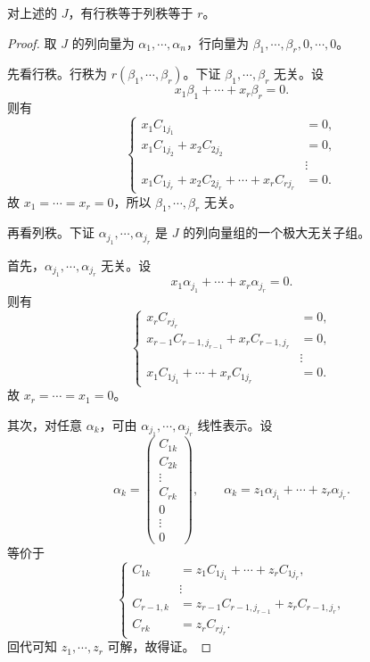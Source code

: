 \begin{theorem}
	对上述的 $J$，有行秩等于列秩等于 $r$。
\end{theorem}
\begin{proof}
	取 $J$ 的列向量为 $\alpha_1,\cdots,\alpha_n$，行向量为
	$\beta_1,\cdots,\beta_r,0,\cdots,0$。
	
	先看行秩。行秩为 $r(\beta_1,\cdots,\beta_r)$。下证
	$\beta_1,\cdots,\beta_r$ 无关。设
	\[
	x_1\beta_1+\cdots+x_r\beta_r=0.
	\]
	则有
	\[
	\left\{
	\begin{aligned}
		x_1C_{1j_1}&=0,\\
		x_1C_{1j_2}+x_2C_{2j_2}&=0,\\
		&\vdots\\
		x_1C_{1j_r}+x_2C_{2j_r}+\cdots+x_rC_{rj_r}&=0.
	\end{aligned}
	\right.
	\]
	故 $x_1=\cdots=x_r=0$，所以 $\beta_1,\cdots,\beta_r$ 无关。
	
	再看列秩。下证 $\alpha_{j_1},\cdots,\alpha_{j_r}$ 是 $J$ 的列向量组的一个极大无关子组。
	
	首先，$\alpha_{j_1},\cdots,\alpha_{j_r}$ 无关。设
	\[
	x_1\alpha_{j_1}+\cdots+x_r\alpha_{j_r}=0.
	\]
	则有
	\[
	\left\{
	\begin{aligned}
		x_rC_{rj_r}&=0,\\
		x_{r-1}C_{r-1,j_{r-1}}+x_rC_{r-1,j_r}&=0,\\
		&\vdots\\
		x_1C_{1j_1}+\cdots+x_rC_{1j_r}&=0.
	\end{aligned}
	\right.
	\]
	故 $x_r=\cdots=x_1=0$。
	
	其次，对任意 $\alpha_k$，可由 $\alpha_{j_1},\cdots,\alpha_{j_r}$ 线性表示。设
	\[
	\alpha_k=
	\begin{pmatrix}
		C_{1k}\\
		C_{2k}\\
		\vdots\\
		C_{rk}\\
		0\\
		\vdots\\
		0
	\end{pmatrix},
	\qquad
	\alpha_k=z_1\alpha_{j_1}+\cdots+z_r\alpha_{j_r}.
	\]
	等价于
	\[
	\left\{
	\begin{aligned}
		C_{1k}&=z_1C_{1j_1}+\cdots+z_rC_{1j_r},\\
		&\vdots\\
		C_{r-1,k}&=z_{r-1}C_{r-1,j_{r-1}}+z_rC_{r-1,j_r},\\
		C_{rk}&=z_rC_{rj_r}.
	\end{aligned}
	\right.
	\]
	回代可知 $z_1,\cdots,z_r$ 可解，故得证。
\end{proof}

